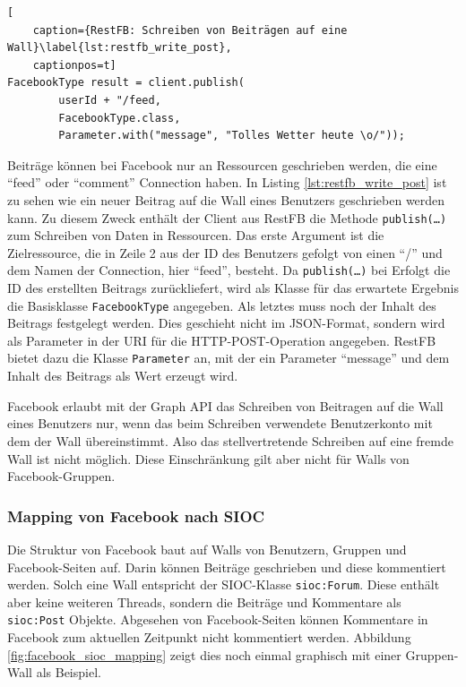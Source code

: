 \begin{lstlisting}[
    caption={RestFB: Schreiben von Beiträgen auf eine Wall}\label{lst:restfb_write_post},
    captionpos=t]
FacebookType result = client.publish(
        userId + "/feed,
        FacebookType.class,
        Parameter.with("message", "Tolles Wetter heute \o/"));
\end{lstlisting}

Beiträge können bei Facebook nur an Ressourcen geschrieben werden, die eine \enquote{feed} oder \enquote{comment} Connection haben. In Listing \ref{lst:restfb_write_post} ist zu sehen wie ein neuer Beitrag auf die Wall eines Benutzers geschrieben werden kann. Zu diesem Zweck enthält der Client aus RestFB die Methode \texttt{publish(\dots)} zum Schreiben von Daten in Ressourcen. Das erste Argument ist die Zielressource, die in Zeile 2 aus der ID des Benutzers gefolgt von einen \enquote{/} und dem Namen der Connection, hier \enquote{feed}, besteht. Da \texttt{publish(\dots)} bei Erfolgt die ID des erstellten Beitrags zurückliefert, wird als Klasse für das erwartete Ergebnis die Basisklasse \texttt{FacebookType} angegeben. Als letztes muss noch der Inhalt des Beitrags festgelegt werden. Dies geschieht nicht im JSON-Format, sondern wird als Parameter in der URI für die HTTP-POST-Operation angegeben. RestFB bietet dazu die Klasse \texttt{Parameter} an, mit der ein Parameter \enquote{message} und dem Inhalt des Beitrags als Wert erzeugt wird.

Facebook erlaubt mit der Graph API das Schreiben von Beitragen auf die Wall eines Benutzers nur, wenn das beim Schreiben verwendete Benutzerkonto mit dem der Wall übereinstimmt. Also das stellvertretende Schreiben auf eine fremde Wall ist nicht möglich. Diese Einschränkung gilt aber nicht für Walls von Facebook-Gruppen.


\subsubsection{Mapping von Facebook nach SIOC} %
\label{ssub:facebook_mapping_nach_sioc}

Die Struktur von Facebook baut auf Walls von Benutzern, Gruppen und Facebook-Seiten auf. Darin können Beiträge geschrieben und diese kommentiert werden. Solch eine Wall entspricht der SIOC-Klasse \texttt{sioc:Forum}. Diese enthält aber keine weiteren Threads, sondern die Beiträge und Kommentare als \texttt{sioc:Post} Objekte. Abgesehen von Facebook-Seiten können Kommentare in Facebook zum aktuellen Zeitpunkt nicht kommentiert werden. Abbildung \ref{fig:facebook_sioc_mapping} zeigt dies noch einmal graphisch mit einer Gruppen-Wall als Beispiel.

